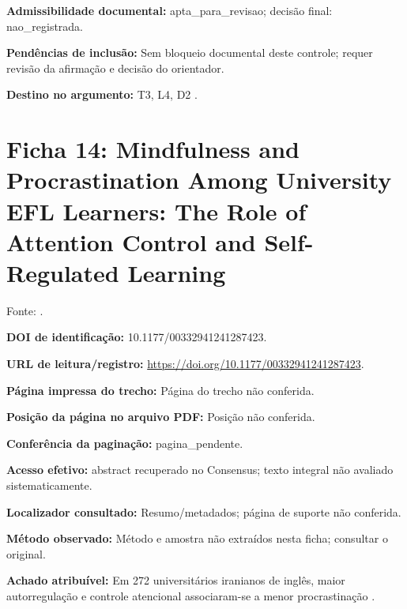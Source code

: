 \noindent\textbf{Admissibilidade documental:} apta\_para\_revisao; decisão final: nao\_registrada.\par\medskip

\noindent\textbf{Pendências de inclusão:} Sem bloqueio documental deste controle; requer revisão da afirmação e decisão do orientador.\par\medskip

\noindent\textbf{Destino no argumento:} T3, L4, D2 .

\clearpage\section*{Ficha 14: Mindfulness and Procrastination Among University EFL Learners: The Role of Attention Control and Self-Regulated Learning}

Fonte: \citet{education_taghavi2024}.

\noindent\textbf{DOI de identificação:} 10.1177/00332941241287423.\par\medskip

\noindent\textbf{URL de leitura/registro:} \url{https://doi.org/10.1177/00332941241287423}.\par\medskip

\noindent\textbf{Página impressa do trecho:} Página do trecho não conferida.\par\medskip

\noindent\textbf{Posição da página no arquivo PDF:} Posição não conferida.\par\medskip

\noindent\textbf{Conferência da paginação:} pagina\_pendente.\par\medskip

\noindent\textbf{Acesso efetivo:} abstract recuperado no Consensus; texto integral não avaliado sistematicamente.\par\medskip

\noindent\textbf{Localizador consultado:} Resumo/metadados; página de suporte não conferida.\par\medskip

\noindent\textbf{Método observado:} Método e amostra não extraídos nesta ficha; consultar o original.\par\medskip

\noindent\textbf{Achado atribuível:} Em 272 universitários iranianos de inglês, maior autorregulação e controle atencional associaram-se a menor procrastinação \citep{education_taghavi2024}.\par\medskip

